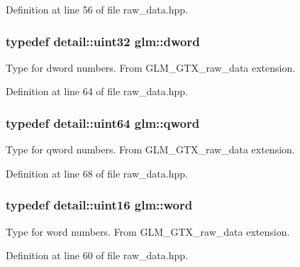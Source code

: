 Definition at line 56 of file raw\_\-data.hpp.\hypertarget{group__gtx__raw__data_g1fc2589df6d44e923cd1820cf14805cf}{
\subsubsection[dword]{\setlength{\rightskip}{0pt plus 5cm}typedef detail::uint32 {\bf glm::dword}}}
\label{group__gtx__raw__data_g1fc2589df6d44e923cd1820cf14805cf}


Type for dword numbers. From GLM\_\-GTX\_\-raw\_\-data extension. 

Definition at line 64 of file raw\_\-data.hpp.\hypertarget{group__gtx__raw__data_g32447af289e879589883c9b7e3be1246}{
\subsubsection[qword]{\setlength{\rightskip}{0pt plus 5cm}typedef detail::uint64 {\bf glm::qword}}}
\label{group__gtx__raw__data_g32447af289e879589883c9b7e3be1246}


Type for qword numbers. From GLM\_\-GTX\_\-raw\_\-data extension. 

Definition at line 68 of file raw\_\-data.hpp.\hypertarget{group__gtx__raw__data_g5617a479d471021b5c773c5e969ba46d}{
\subsubsection[word]{\setlength{\rightskip}{0pt plus 5cm}typedef detail::uint16 {\bf glm::word}}}
\label{group__gtx__raw__data_g5617a479d471021b5c773c5e969ba46d}


Type for word numbers. From GLM\_\-GTX\_\-raw\_\-data extension. 

Definition at line 60 of file raw\_\-data.hpp.